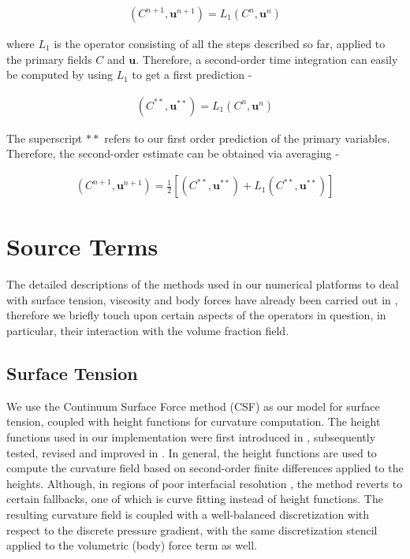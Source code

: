 \begin{align}
\left(C^{n+1},\boldsymbol{u}^{n+1}\right) = L_{1}\left( C^{n},\boldsymbol{u}^{n} \right)
\end{align}

where $L_{1}$ is the operator consisting of all the steps described 
so far, applied to the primary fields $C$ and $\boldsymbol{u}$. 
Therefore, a second-order time integration can easily be 
computed by using $L_{1}$ to get a first prediction -   

\begin{align}
\left(C^{**},\boldsymbol{u}^{**}\right) = L_{1}\left( C^{n},\boldsymbol{u}^{n} \right)
\end{align}

The superscript $**$ refers to our first order prediction of the primary variables. 
Therefore, the second-order estimate can be obtained via averaging -  

\begin{align}
\left(C^{n+1},\boldsymbol{u}^{n+1}\right) = \frac{1}{2}\left[ \left(C^{**},\boldsymbol{u}^{**} \right) + L_{1}\left( C^{**},\boldsymbol{u}^{**} \right) \right]
\end{align}


\section{Source Terms}
The detailed descriptions of the methods used in our numerical platforms to deal with surface tension,
viscosity and body forces have already been carried out in \cite{paris, basilisk, popinet2009accurate}, 
therefore we briefly touch upon certain aspects of the operators in question, in particular, 
their interaction with the volume fraction field.

\subsection*{Surface Tension}
We use the Continuum Surface Force method (CSF) as our model for surface tension, 
coupled with height functions for curvature computation. 
The height functions used in our implementation were first introduced in \cite{popinet2009accurate}
, subsequently tested, revised and improved in \cite{bornia2011properties,owkes2015mesh}. 
In general, the height functions are used to compute the curvature field based 
on second-order finite differences applied to the heights. 
Although, in regions of poor interfacial resolution 
, 
the method reverts to certain fallbacks, one of which is curve fitting instead of height functions.  
The resulting curvature field is coupled with a well-balanced discretization with
respect to the discrete pressure gradient, with the same discretization 
stencil applied to the volumetric (body) force term as well. 



